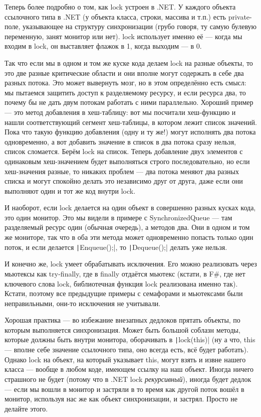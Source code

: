 \documentclass{../../text-style}
\begin{document}
Теперь более подробно о том, как lock устроен в .NET. У каждого объекта ссылочного типа в .NET (у объекта класса, строки, массива и т.п.) есть private-поле, указывающее на структуру синхронизации (грубо говоря, ту самую булевую переменную, занят монитор или нет). lock использует именно её --- когда мы входим в lock, он выставляет флажок в 1, когда выходим --- в 0. 

Так что если мы в одном и том же куске кода делаем lock на разные объекты, то это две разные критические области и они вполне могут содержать в себе два разных потока. Это может вывернуть мозг, но в этом определённо есть смысл: мы пытаемся защитить доступ к разделяемому ресурсу, и если ресурса два, то почему бы не дать двум потокам работать с ними параллельно. Хороший пример --- это метод добавления в хеш-таблицу: вот мы посчитали хеш-функцию и нашли соответствующий сегмент хеш-таблицы, в котором лежит список значений. Пока что такую функцию добавления (одну и ту же!) могут исполнять два потока одновременно, а вот добавить значение в список в два потока сразу нельзя, список сломается. Берём lock на список. Теперь добавление двух элементов с одинаковым хеш-значением будет выполняться строго последовательно, но если хеш-значения разные, то никаких проблем --- два потока меняют два разных списка и могут спокойно делать это независимо друг от друга, даже если они выполняют один и тот же код внутри lock. 

И наоборот, если lock делается на один объект в совершенно разных кусках кода, это один монитор. Это мы видели в примере с SynchronizedQueue --- там разделяемый ресурс один (обычная очередь), а методов два. Они в одном и том же мониторе, так что в оба эти метода может одновременно попасть только один поток, и если делается \texttt|Enqueue();|, то \texttt|Dequeue();| делать уже нельзя.

И конечно же, lock умеет обрабатывать исключения. Его можно реализовать через мьютексы как try-finally, где в finally отдаётся мьютекс (кстати, в F\#, где нет ключевого слова lock, библиотечная функция lock реализована именно так). Кстати, поэтому все предыдущие примеры с семафорами и мьютексами были неправильными, они-то исключения не учитывали.

Хорошая практика --- во избежание внезапных дедлоков прятать объекты, по которым выполняется синхронизация. Может быть большой соблазн методы, которые должны быть внутри монитора, оборачивать в \texttt|lock(this)| (ну а что, this --- вполне себе значение ссылочного типа, оно всегда есть, всё будет работать). Однако lock на объект, на который указывает this, могут взять и извне нашего класса --- вообще в любом коде, имеющем ссылку на наш объект. Иногда ничего страшного не будет (потому что в .NET lock \textit{рекурсивный}), иногда будет дедлок --- если мы вошли в монитор и застряли в то время как другой поток вошёл в монитор, используя нас же как объект синхронизации, и застрял. Просто не делайте этого.
\end{document}
